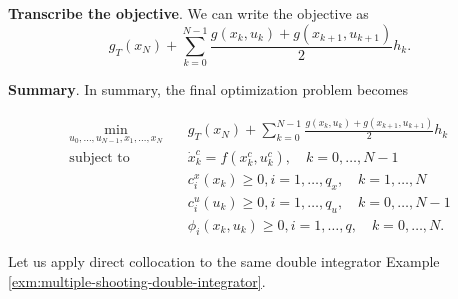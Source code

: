 \documentclass[
]{book}
\theoremstyle{definition}
\theoremstyle{definition}
\theoremstyle{definition}
\theoremstyle{definition}
\theoremstyle{remark}
\begin{document}
\textbf{Transcribe the objective}. We can write the objective as
\[
g_T(x_N) + \sum_{k=0}^{N-1} \frac{g(x_k,u_k) + g(x_{k+1},u_{k+1})}{2} h_k.
\]

\textbf{Summary}. In summary, the final optimization problem becomes

\begin{equation} 
\begin{split}
\min_{u_0,\dots,u_{N-1},x_1,\dots,x_N} & \quad  g_T(x_N) + \sum_{k=0}^{N-1} \frac{g(x_k,u_k) + g(x_{k+1},u_{k+1})}{2} h_k \\
\text{subject to} & \quad \dot{x}_k^c = f(x_k^c,u_k^c), \quad k=0,\dots,N-1 \\
& \quad c_i^x(x_k) \geq 0,i=1,\dots,q_x, \quad k=1,\dots,N \\
& \quad c_i^u(u_k) \geq 0,i=1,\dots,q_u, \quad k=0,\dots,N-1 \\
& \quad \phi_i (x_k,u_k) \geq 0, i=1,\dots,q, \quad k=0,\dots,N.
\end{split}
\label{eq:constrained-optimal-control-nlp}
\end{equation}

Let us apply direct collocation to the same double integrator Example \ref{exm:multiple-shooting-double-integrator}.
\end{document}
